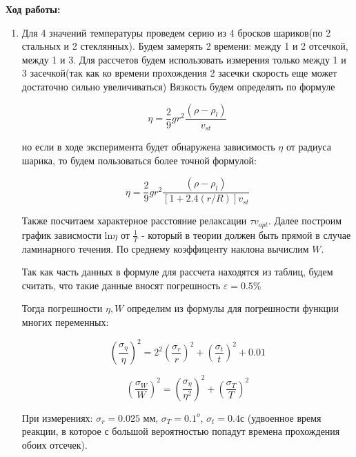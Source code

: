 \documentclass{article}
\begin{document}
\newpage
\textbf{Ход работы:}

\begin{enumerate}
    \item
    Для 4 значений температуры проведем серию из 4 бросков шариков(по 2 стальных и 2 стеклянных). Будем замерять 2 времени: между 1 и 2 отсечкой, между 1 и 3. Для рассчетов будем использовать измерения только между 1 и 3 засечкой(так как ко времени прохождения 2 засечки скорость еще может достаточно сильно увеличиваться)
    Вязкость будем определять по формуле 
    
    \begin{equation}
    \eta = \frac{2}{9} g r^2 \frac{(\rho - \rho_{l} )}{v_{st}}
    \end{equation}
    
    но если в ходе эксперимента будет обнаружена зависимость $\eta$ от радиуса шарика, то будем пользоваться более точной формулой:
    
    \begin{equation}
    \eta = \frac{2}{9} g r^2 \frac{(\rho - \rho_{l} )}{[1+2.4(r/R)]v_{st}}
    \end{equation}
    
    Также посчитаем характерное расстояние релаксации $\tau v_{opt}$.
    Далее построим график зависмости $\mathrm{ln}\eta$ от $\frac{1}{T}$ - который в теории должен быть прямой в случае ламинарного течения. По среднему коэффиценту наклона вычислим $W$.
    
    Так как часть данных в формуле для рассчета находятся из таблиц, будем считать, что такие данные вносят погрешность $\varepsilon = 0.5\%$
    
    Тогда погрешности $\eta, W$ определим из формулы для погрешности функции многих переменных:
    
    \begin{equation}
    (\frac{\sigma_\eta}{\eta})^2 = 2^2(\frac{\sigma_r}{r})^2 +  (\frac{\sigma_t}{t})^2 + 0.01
    \end{equation} 
    
    \begin{equation}
    (\frac{\sigma_W}{W})^2 = (\frac{\sigma_\eta}{\eta^2})^2 +  (\frac{\sigma_T}{T})^2
    \end{equation} 
    
    При измерениях:
    $\sigma_r = 0.025$ мм, $\sigma_T = 0.1^o$, $\sigma_t = 0.4$с (удвоенное время реакции, в которое с большой вероятностью попадут времена прохождения обоих отсечек).
    

\end{enumerate}
\end{document}
